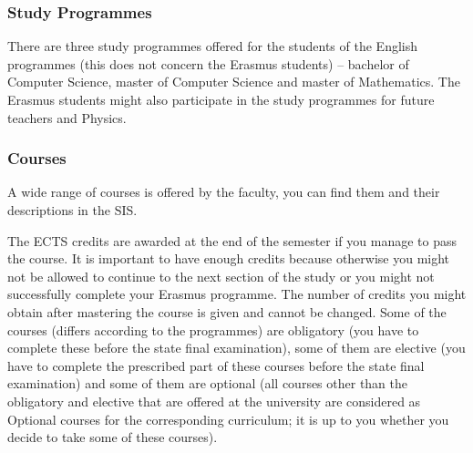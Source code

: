 \subsubsection{Study Programmes}
There are three study programmes offered for the students of the English
programmes (this does not concern the Erasmus students) -- bachelor of Computer
Science, master of Computer Science and master of Mathematics. The Erasmus
students might also participate in the study programmes for future teachers and
Physics.


\subsubsection{Courses}
A wide range of courses is offered by the faculty, you can find them and their
descriptions in the SIS.

The ECTS credits are awarded at the end of the semester if you manage to pass
the course.
It is important to have enough credits because otherwise you might not be
allowed to continue to the next section of the study or you might not
successfully complete your Erasmus programme.
The number of credits you might obtain after mastering the course is given and
cannot be changed.
Some of the courses (differs according to the programmes) are obligatory (you
have to complete these before the state final examination), some of them are
elective (you have to complete the prescribed part of these courses before the
state final examination) and some of them are optional (all courses other than
the obligatory and elective that are offered at the university are considered as
Optional courses for the corresponding curriculum; it is up to you whether you
decide to take some of these courses).

